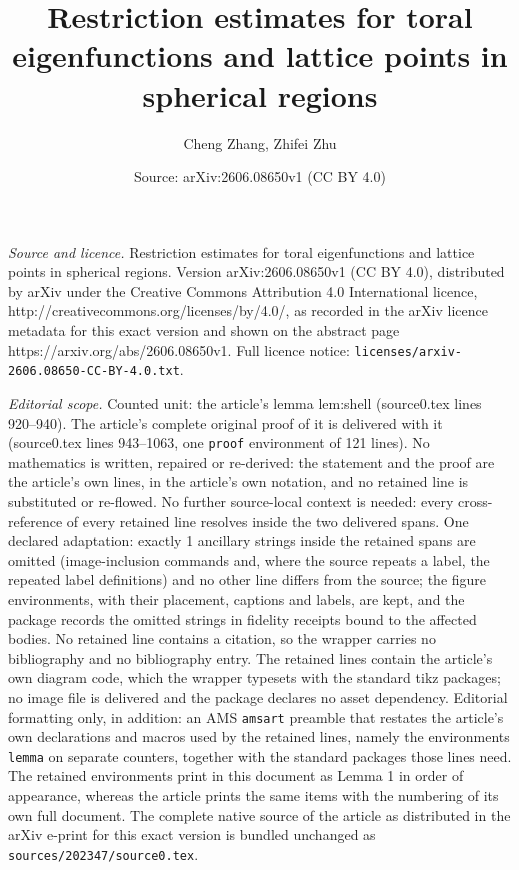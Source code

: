 \documentclass[10pt,a4paper]{amsart}
\title{Restriction estimates for toral eigenfunctions and lattice points in spherical regions}
\author{Cheng Zhang, Zhifei Zhu}
\date{Source: arXiv:2606.08650v1 (CC BY 4.0)}
\begin{document}
\maketitle

\noindent\emph{Source and licence.} Restriction estimates for toral eigenfunctions and lattice points in spherical regions. Version arXiv:2606.08650v1 (CC BY 4.0), distributed by arXiv under the Creative Commons Attribution 4.0 International licence, http://creativecommons.org/licenses/by/4.0/, as recorded in the arXiv licence metadata for this exact version and shown on the abstract page https://arxiv.org/abs/2606.08650v1. Full licence notice: \texttt{licenses/arxiv-2606.08650-CC-BY-4.0.txt}.\par\smallskip

\noindent\textit{Editorial scope.} Counted unit: the article's lemma lem:shell (source0.tex lines 920--940). The article's complete original proof of it is delivered with it (source0.tex lines 943--1063, one \texttt{proof} environment of 121 lines). No mathematics is written, repaired or re-derived: the statement and the proof are the article's own lines, in the article's own notation, and no retained line is substituted or re-flowed.  No further source-local context is needed: every cross-reference of every retained line resolves inside the two delivered spans.  One declared adaptation: exactly 1 ancillary strings inside the retained spans are omitted (image-inclusion commands and, where the source repeats a label, the repeated label definitions) and no other line differs from the source; the figure environments, with their placement, captions and labels, are kept, and the package records the omitted strings in fidelity receipts bound to the affected bodies.  No retained line contains a citation, so the wrapper carries no bibliography and no bibliography entry.  The retained lines contain the article's own diagram code, which the wrapper typesets with the standard tikz packages; no image file is delivered and the package declares no asset dependency.  Editorial formatting only, in addition: an AMS \texttt{amsart} preamble that restates the article's own declarations and macros used by the retained lines, namely the environments \texttt{lemma} on separate counters, together with the standard packages those lines need.  The retained environments print in this document as Lemma 1 in order of appearance, whereas the article prints the same items with the numbering of its own full document.  The complete native source of the article as distributed in the arXiv e-print for this exact version is bundled unchanged as \texttt{sources/202347/source0.tex}.
\end{document}
